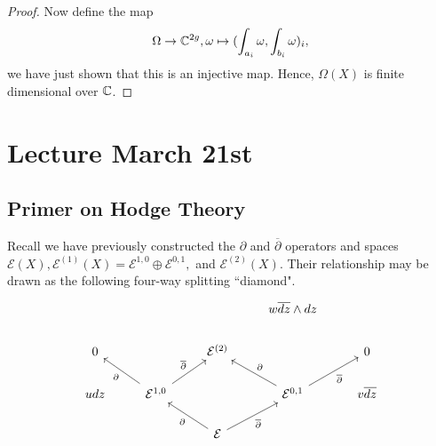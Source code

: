 \documentclass{article}
\begin{document}
{\begin{proof}
    Now define the map
    \[\Omega \to \mathbb{C}^{2g}, \omega \mapsto (\int_{a_i} \omega, \int_{b_i} \omega)_i,\]
    we have just shown that this is an injective map. Hence, $\Omega(X)$ is finite dimensional over $\mathbb{C}$.

\end{proof}

\newpage
\section{Lecture March 21st}

\subsection{Primer on Hodge Theory}
Recall we have previously constructed the $\partial$ and $\overline{\partial}$ operators and spaces $\mathcal{E}(X), \mathcal{E}^{(1)}(X) = \mathcal{E}^{1, 0} \oplus \mathcal{E}^{0, 1}, $ and $\mathcal{E}^{(2)}(X)$. Their relationship may be drawn as the following four-way splitting ``diamond".
\[\begin{tikzcd}
	&&& {w \overline{dz} \wedge dz} \\
	0 && {\mathcal{E}^{(2)}} && 0 \\
	{u dz} & {\mathcal{E}^{1, 0}} && {\mathcal{E}^{0, 1}} & {v \overline{dz}} \\
	&& {\mathcal{E}}
	\arrow["\partial", from=3-2, to=2-1]
	\arrow["{\overline{\partial}}", from=3-2, to=2-3]
	\arrow["\partial"', from=3-4, to=2-3]
	\arrow["{\overline{\partial}}"', from=3-4, to=2-5]
	\arrow["\partial", from=4-3, to=3-2]
	\arrow["{\overline{\partial}}"', from=4-3, to=3-4]
\end{tikzcd}\]

}
\end{document}
